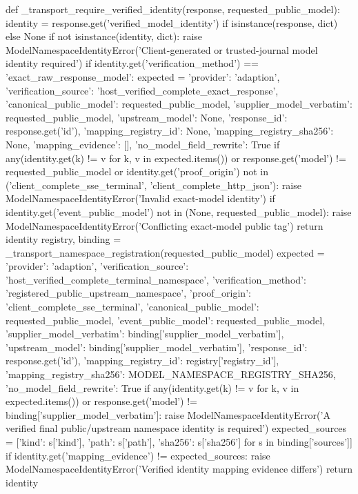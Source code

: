 {def _transport_require_verified_identity(response, requested_public_model):
    identity = response.get('verified_model_identity') if isinstance(response, dict) else None
    if not isinstance(identity, dict):
        raise ModelNamespaceIdentityError('Client-generated or trusted-journal model identity required')
    if identity.get('verification_method') == 'exact_raw_response_model':
        expected = {'provider': 'adaption', 'verification_source': 'host_verified_complete_exact_response',
            'canonical_public_model': requested_public_model, 'supplier_model_verbatim': requested_public_model,
            'upstream_model': None, 'response_id': response.get('id'),
            'mapping_registry_id': None, 'mapping_registry_sha256': None, 'mapping_evidence': [],
            'no_model_field_rewrite': True}
        if any(identity.get(k) != v for k, v in expected.items()) or response.get('model') != requested_public_model or identity.get('proof_origin') not in ('client_complete_sse_terminal', 'client_complete_http_json'):
            raise ModelNamespaceIdentityError('Invalid exact-model identity')
        if identity.get('event_public_model') not in (None, requested_public_model):
            raise ModelNamespaceIdentityError('Conflicting exact-model public tag')
        return identity
    registry, binding = _transport_namespace_registration(requested_public_model)
    expected = {'provider': 'adaption', 'verification_source': 'host_verified_complete_terminal_namespace',
        'verification_method': 'registered_public_upstream_namespace', 'proof_origin': 'client_complete_sse_terminal',
        'canonical_public_model': requested_public_model, 'event_public_model': requested_public_model,
        'supplier_model_verbatim': binding['supplier_model_verbatim'], 'upstream_model': binding['supplier_model_verbatim'],
        'response_id': response.get('id'), 'mapping_registry_id': registry['registry_id'],
        'mapping_registry_sha256': MODEL_NAMESPACE_REGISTRY_SHA256, 'no_model_field_rewrite': True}
    if any(identity.get(k) != v for k, v in expected.items()) or response.get('model') != binding['supplier_model_verbatim']:
        raise ModelNamespaceIdentityError('A verified final public/upstream namespace identity is required')
    expected_sources = [{'kind': s['kind'], 'path': s['path'], 'sha256': s['sha256']} for s in binding['sources']]
    if identity.get('mapping_evidence') != expected_sources:
        raise ModelNamespaceIdentityError('Verified identity mapping evidence differs')
    return identity


}
